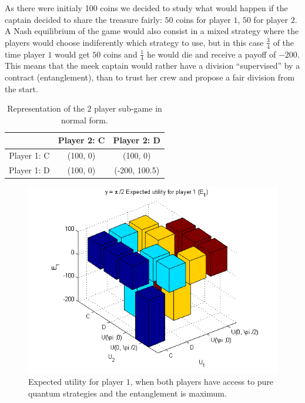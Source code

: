 \documentclass[10pt,twocolumn]{llncs}
\begin{document}
As there were initialy 100 coins we decided to study what would happen if the captain decided to share the treasure fairly: $50$ coins for player $1$, $50$ for player $2$. A Nash equilibrium of the game would also consist in a mixed strategy where the players would choose indiferently which strategy to use, but in this case $\frac{3}{4}$ of the time player $1$ would get $50$ coins and $\frac{1}{4}$ he would die and receive a payoff of $-200$. This means that the meek captain would rather have a division ``supervised'' by a contract (entanglement), than to trust her crew and propose a fair division from the start.

\begin{table}[h]
\begin{center}
\begin{centering}
\begin{tabular}{ccc}
\hline 
  & Player 2: C & Player 2: D\tabularnewline
\hline 
Player 1: C & (100, 0) & (100, 0)\tabularnewline
Player 1: D & (100, 0) & (-200, 100.5)\tabularnewline
\hline 
\end{tabular}

\par\end{centering}
\caption{Representation of the $2$ player sub-game in normal form.}
\label{tab:classico2jogadores_analise}
\end{center}
\end{table}

\begin{figure}[h!]
\centering 
\includegraphics[scale=0.60]{Figures/1.5qubit/p2_E1.png}
\caption{Expected utility for player $1$, when both players have access to pure quantum strategies and the entanglement is maximum. }
\label{fig:pg_2players_99_0_1:1}
\end{figure}
\end{document}
